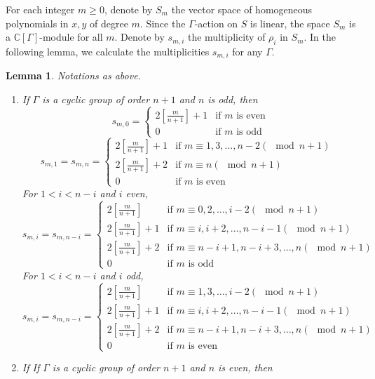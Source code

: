 \documentclass{amsart}[12pt]
\newtheorem{lemma}[theorem]{Lemma}
\theoremstyle{definition}
\theoremstyle{remark}
\numberwithin{equation}{section}
\begin{document}
For each integer $m \geq 0$, denote by $S_m$ the vector space of homogeneous polynomials in $x, y$ of degree $m$. Since the $\Gamma$-action on $S$ is linear, the space $S_m$ is a $\mathbb{C}[\Gamma]$-module for all $m$. Denote by $s_{m, i}$ the multiplicity of $\rho_i$ in $S_m$. In the following lemma, we calculate the multiplicities $s_{m, i}$ for any $\Gamma$.


\begin{lemma}\label{equivhilbfunc} 
Notations as above.
\begin{enumerate}
\item If $\Gamma$ is a cyclic group of order $n + 1$ and $n$ is odd, then 
\[
s_{m, 0} = 
\begin{cases} 
2 [\frac{m}{n + 1}] + 1 & \textrm{if $m$ is even} \\
0 & \textrm{if $m$ is odd}
\end{cases}
\]
\[
s_{m, 1} = s_{m, n} = 
\begin{cases} 
2[\frac{m}{n + 1}] + 1 & \textrm{if $m \equiv 1, 3, \dots, n - 2 (\mod n + 1)$ } \\
2[\frac{m}{n + 1}] + 2 & \textrm{if $m \equiv n (\mod n + 1)$ } \\
0 & \textrm{if $m$ is even}
\end{cases}
\]
For $1 < i < n - i$ and $i$ even,
\[
s_{m, i} = s_{m, n - i} = 
\begin{cases} 
2 [\frac{m}{n + 1}] & \textrm{if $m \equiv 0, 2, \dots, i - 2 (\mod n + 1)$ } \\
2 [\frac{m}{n + 1}] + 1 & \textrm{if $m \equiv i, i + 2, \dots, n - i - 1(\mod n + 1)$ } \\
2 [\frac{m}{n + 1}] + 2 & \textrm{if $m \equiv n - i + 1, n - i + 3, \dots, n(\mod n + 1)$ } \\
0 & \textrm{if $m$ is odd}
\end{cases}
\]
For $1 < i < n - i$ and $i$ odd,
\[
s_{m, i} = s_{m, n - i} = 
\begin{cases} 
2 [\frac{m}{n + 1}] & \textrm{if $m \equiv 1, 3, \dots, i - 2 (\mod n + 1)$ } \\
2 [\frac{m}{n + 1}] + 1 & \textrm{if $m \equiv i, i + 2, \dots, n - i - 1(\mod n + 1)$ } \\
2 [\frac{m}{n + 1}] + 2 & \textrm{if $m \equiv n - i + 1, n - i + 3, \dots, n (\mod n + 1)$ } \\
0 & \textrm{if $m$ is even}
\end{cases}
\]
\item If If $\Gamma$ is a cyclic group of order $n + 1$ and $n$ is even, then 

\end{enumerate}
\end{lemma}
\end{document}
